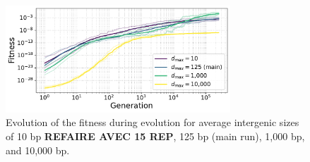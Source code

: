 \begin{figure}
\centering
\includegraphics[width=0.75\textwidth]{param/mean-intergene/fitness_all_with_main.pdf}
\caption{Evolution of the fitness during evolution for average intergenic sizes of 10 bp \textbf{REFAIRE AVEC 15 REP}, 125 bp (main run), 1,000 bp, and 10,000 bp.}
\end{figure}


